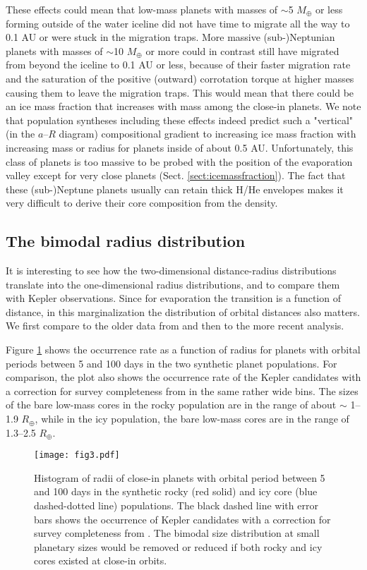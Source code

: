 \documentclass[]{emulateapj}
\def\mearth{M_{\oplus}}
\begin{document}
These effects could mean that low-mass planets with masses of $\sim$5 $\mearth$ or less forming outside of the water iceline did not have time to migrate all the way to 0.1 AU or were stuck in the migration traps. More massive (sub-)Neptunian planets with masses of $\sim$10 $\mearth$ or more could in contrast still have migrated from beyond the iceline to 0.1 AU or less, because of their faster migration rate and the saturation of the positive (outward) corrotation torque at higher masses causing them to leave the migration traps. This would mean that there could be an ice mass fraction that increases with mass among the close-in planets. We note that population syntheses including these effects \citep{Alibert2013} indeed predict such a "vertical" (in the $a$--$R$ diagram) compositional gradient to increasing ice mass fraction with increasing mass or radius for planets inside of about 0.5 AU. Unfortunately, this class of planets is too massive to be probed with the position of the evaporation valley except for very close planets (Sect. \ref{sect:icemassfraction}). The fact that these (sub-)Neptune planets usually can retain thick H/He envelopes makes it very difficult to derive their core composition from the density. 

\subsection{The bimodal radius distribution}
It is interesting to see how the two-dimensional distance-radius distributions translate into the one-dimensional radius distributions, and to compare them with Kepler observations. Since for evaporation the transition is a function of distance, in this marginalization the distribution of orbital distances also matters. We first compare to the older data from \citet{Petigura2013} and then to the more recent \citet{Fulton2017} analysis. 

Figure \ref{compkepler} shows the occurrence rate as a function of radius for planets with orbital periods between 5 and 100 days in the two synthetic planet populations. For comparison, the plot also shows the occurrence rate of the Kepler candidates with a correction for survey completeness from \citet{Petigura2013} in the same rather wide bins. The sizes of the bare low-mass cores in the rocky population are in the range of about $\sim$ 1--1.9 $R_{\oplus}$, while in the icy population, the bare low-mass cores are in the range of 1.3--2.5 $R_{\oplus}$.

\begin{figure}
\texttt{[image: fig3.pdf]}
 \caption{Histogram of radii of close-in planets with orbital period between 5 and 100 days in the synthetic rocky (red solid) and  icy core (blue dashed-dotted line) populations. The black dashed line with error bars shows the occurrence of  Kepler candidates with a correction for survey completeness from \citet{Petigura2013}. The bimodal size distribution at small planetary sizes would be removed or reduced if both rocky and icy cores existed at close-in orbits.}
\label{compkepler}
\end{figure}
\end{document}
